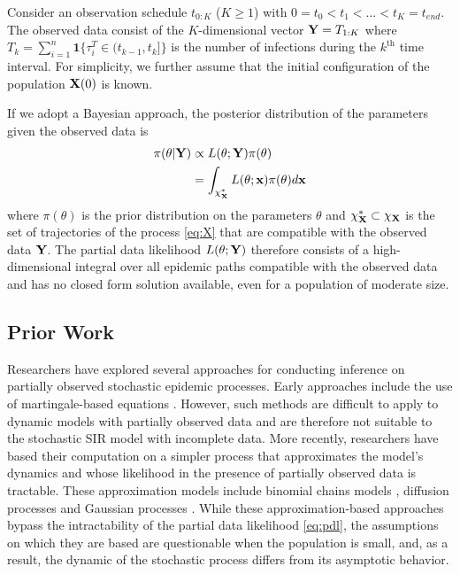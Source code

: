 \documentclass[11pt]{article}
\begin{document}
	Consider an observation schedule $t_{0:K}$ ($K \ge 1$) with $0 = t_0 < t_1 < \dots < t_K = t_{end}$. The observed data consist of the $K$-dimensional vector $\mathbf{Y} = T_{1:K}$ where $T_k = \sum_{i=1}^n \mathbf{1}\{\tau^T_i \in (t_{k-1}, t_k]\}$ is the number of infections during the $k^{\text{th}}$ time interval.
	For simplicity, we further assume that the initial configuration of the population $\mathbf{X}(0)$ is known.
	
	If we adopt a Bayesian approach, the posterior distribution of the parameters given the observed data is
	\begin{align}
		\label{eq:pdl}
		\pi(\theta|\mathbf{Y}) 
		& \propto L(\theta; \mathbf{Y})\pi(\theta) \nonumber \\
		& = \int_{\chi^*_{\mathbf{X}}} L(\theta; \mathbf{x}) \pi(\theta) d\mathbf{x}
	\end{align}
	where $\pi(\theta)$ is the prior distribution on the parameters $\theta$ and
	$\chi^*_{\mathbf{X}} \subset \chi_{\mathbf{X}}$ is the set of trajectories of the process \ref{eq:X} that are compatible with the observed data $\mathbf{Y}$.
	The partial data likelihood $L(\theta; \mathbf{Y})$ therefore consists of a high-dimensional integral over all epidemic paths compatible with the observed data and has no closed form solution available, even for a population of moderate size.
		
	\subsection{Prior Work}
	\label{sec:pre}
	Researchers have explored several approaches for conducting inference on partially observed stochastic epidemic processes. Early approaches include the use of martingale-based equations \cite{Becker.1977, Watson.1981, Sudbury.1985}. However, such methods are difficult to apply to dynamic models with partially observed data and are therefore not suitable to the stochastic SIR model with incomplete data.
	More recently, researchers have based their computation on a simpler process that approximates the model's dynamics and whose likelihood in the presence of partially observed data is tractable. These approximation models include binomial chains models \cite{Greenwood.1931, Abbey.1952}, diffusion processes \cite{Cauchemez.2008, Fintzi.2020} and Gaussian processes \cite{Jandarov.2014}. While these approximation-based approaches bypass the intractability of the partial data likelihood \ref{eq:pdl}, the assumptions on which they are based are questionable when the population is small, and, as a result, the dynamic of the stochastic process differs from its asymptotic behavior.
	
\end{document}
